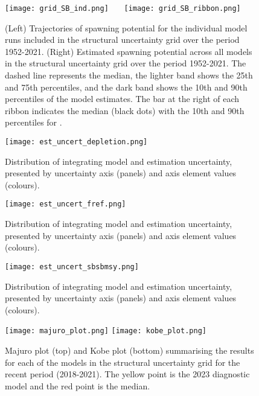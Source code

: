 \newpage
\begin{landscape}
  \begin{figure}[!ht]
    \centering
    \texttt{[image: grid\_SB\_ind.png]}~~~
    \texttt{[image: grid\_SB\_ribbon.png]}
    \caption{(Left) Trajectories of spawning potential for the individual model runs included in the structural uncertainty grid over the period 1952-2021. (Right) Estimated spawning potential across all models in the structural uncertainty grid over the period 1952-2021. The dashed line represents the median, the lighter band shows the 25th and 75th percentiles, and the dark band shows the 10th and 90th percentiles of the model estimates. The bar at the right of each ribbon indicates the median (black dots) with the 10th and 90th percentiles for \sbrecent. \label{fig:grid_SB}}
  \end{figure}
\end{landscape}
\clearpage

\newpage
\begin{figure}[!ht]
  \centering
  \texttt{[image: est\_uncert\_depletion.png]}
  \caption{Distribution of \sbrsbfo integrating model and estimation uncertainty, presented by uncertainty axis (panels) and axis element values (colours). \label{fig:hist_dep}}
\end{figure}
\clearpage

\newpage
\begin{figure}[!ht]
  \centering
  \texttt{[image: est\_uncert\_fref.png]}
  \caption{Distribution of \fref integrating model and estimation uncertainty, presented by uncertainty axis (panels) and axis element values (colours). \label{fig:hist_fref}}
\end{figure}
\clearpage

\newpage
\begin{figure}[!ht]
  \centering
  \texttt{[image: est\_uncert\_sbsbmsy.png]}
  \caption{Distribution of \sbrsbmsy integrating model and estimation uncertainty, presented by uncertainty axis (panels) and axis element values (colours). \label{fig:hist_sbsbmsy}}
\end{figure}
\clearpage

\newpage
\begin{figure}[!ht]
  \centering
  \texttt{[image: majuro\_plot.png]}
  \texttt{[image: kobe\_plot.png]}
  \caption{Majuro plot (top) and Kobe plot (bottom) summarising the results for each of the models in the structural uncertainty grid for the recent period (2018-2021). The yellow point is the 2023 diagnostic model and the red point is the median. \label{fig:majuro_kobe}}
\end{figure}
\clearpage

